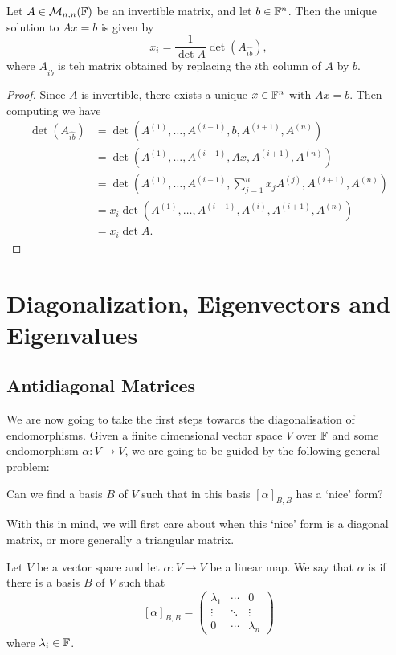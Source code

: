 \documentclass[a4paper]{scrartcl}
\begin{document}
\begin{proposition}
    Let $A \in \mathcal{M}_{n , n}(\mathbb{F})$ be an invertible matrix, and let $b \in \mathbb{F}^n$. Then the unique solution to $Ax = b$ is given by
    $$
    x_i = \frac{1}{\det A} \det(A_{\hat{ib}}),
    $$
    where $A_{\hat{i}b}$ is teh matrix obtained by replacing the $i$th column of $A$ by $b$.
\end{proposition}
\begin{proof}
    Since $A$ is invertible, there exists a unique $x \in \mathbb{F}^n$ with $Ax = b$. Then
    computing we have
    \begin{align*}
        \det(A_{\hat{ib}}) &= \det(A^{(1)}, \dots, A^{(i - 1)}, b, A^{(i + 1)}, A^{(n)}) \\
        &= \det(A^{(1)}, \dots, A^{(i - 1)}, Ax, A^{(i + 1)}, A^{(n)}) \\
        &= \det(A^{(1)}, \dots, A^{(i - 1)}, \sum_{j = 1}^n x_j A^{(j)}, A^{(i + 1)}, A^{(n)}) \\
        &= x_i \det(A^{(1)}, \dots, A^{(i - 1)}, A^{(i)}, A^{(i + 1)}, A^{(n)})  \\
        &= x_i \det A.
    \end{align*}
\end{proof}

\section{Diagonalization, Eigenvectors and Eigenvalues}


\subsection{Antidiagonal Matrices}

We are now going to take the first steps towards the diagonalisation of endomorphisms. 
Given a finite dimensional vector space $V$ over $\mathbb{F}$ and some endomorphism $\alpha: V \rightarrow V$, we are going to be guided by the following general problem:
\begin{center}\color{blue}
    Can we find a basis $B$ of $V$ such that in this basis $[\alpha]_{B, B}$ has a `nice' form?
\end{center}
With this in mind, we will first care about when this `nice' form is a diagonal matrix, or more generally a triangular matrix.


\begin{definition}[Diagonalizable]
    Let $V$ be a vector space and let $\alpha: V \rightarrow V$ be a linear map. We say that $\alpha$ is  if there is a basis $B$ of $V$ such that
    $$
    [\alpha]_{B, B} = \begin{pmatrix}
        \lambda_1 & \cdots & 0 \\
        \vdots & \ddots & \vdots \\
        0 & \cdots & \lambda_n
    \end{pmatrix}
    $$
    where $\lambda_i \in \mathbb{F}$.
\end{definition}
\end{document}
